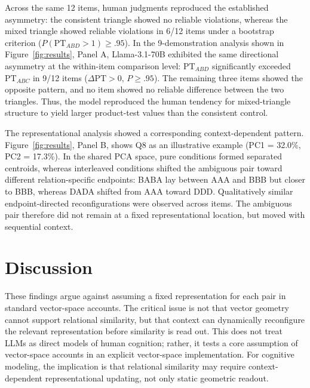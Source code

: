 \documentclass{ccn}
\begin{document}
Across the same 12 items, human judgments reproduced the established
asymmetry: the consistent triangle showed no reliable violations, whereas the
mixed triangle showed reliable violations in 6/12 items under a bootstrap
criterion ($P(\mathrm{PT}_{ABD} > 1) \ge .95$). In the 9-demonstration
analysis shown in Figure~\ref{fig:results}, Panel A, Llama-3.1-70B exhibited
the same directional asymmetry at the within-item comparison level:
$\mathrm{PT}_{ABD}$ significantly exceeded $\mathrm{PT}_{ABC}$ in 9/12 items
($\Delta \mathrm{PT} > 0,\, P \ge .95$). The remaining three items showed the
opposite pattern, and no item showed no reliable difference between the two
triangles. Thus, the model reproduced the human tendency for mixed-triangle
structure to yield larger product-test values than the consistent control.

The representational analysis showed a corresponding context-dependent
pattern. Figure~\ref{fig:results}, Panel B, shows Q8 as an illustrative
example (PC1 = 32.0\%, PC2 = 17.3\%). In the shared PCA space, pure
conditions formed separated centroids, whereas interleaved conditions shifted
the ambiguous pair toward different relation-specific endpoints: BABA lay
between AAA and BBB but closer to BBB, whereas DADA shifted from AAA toward
DDD. Qualitatively similar endpoint-directed reconfigurations were observed
across items. The ambiguous pair therefore did not remain at a fixed
representational location, but moved with sequential context.

\section{Discussion}

These findings argue against assuming a fixed representation for each pair in
standard vector-space accounts. The critical issue is not that vector geometry
cannot support relational similarity, but that context can dynamically
reconfigure the relevant representation before similarity is read out. This does
not treat LLMs as direct models of human cognition; rather, it tests a core
assumption of vector-space accounts in an explicit vector-space implementation.
For cognitive modeling, the implication is that relational similarity may
require context-dependent representational updating, not only static geometric
readout.

\clearpage
\printbibliography
\end{document}
